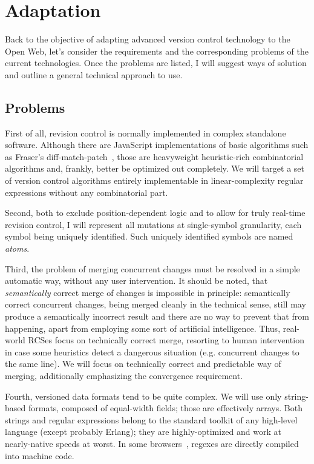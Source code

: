 \documentclass{acm_proc_article-sp}
\begin{document}
\section {Adaptation}   \label{sec:textile}

Back to the objective of adapting advanced version control technology to the Open Web, let's consider the requirements and the corresponding problems of the current technologies. 
Once the problems are listed, I will suggest ways of solution and outline a general technical approach to use.

\subsection {Problems}
First of all, revision control is normally implemented
in complex standalone software. Although there are JavaScript
implementations of basic algorithms such as Fraser's
diff-match-patch~\cite{diff-match-patch}, those are
heavyweight heuristic-rich combinatorial
algorithms and, frankly, better be optimized out
completely. We will target a set of version control
algorithms entirely implementable in 
linear-complexity regular
expressions without any combinatorial part.

Second, both to exclude position-dependent logic and to allow for truly real-time revision control, I will represent all mutations at single-symbol granularity, each symbol being uniquely identified.
Such uniquely identified symbols are named \emph{atoms}.

Third, the problem of merging concurrent changes must
be resolved in a simple automatic way, without any user
intervention. It should be noted, that
\emph{semantically} correct merge of changes is impossible
in principle: semantically correct concurrent
changes, being merged cleanly in
the technical sense, still may produce a semantically
incorrect result and there are no way to prevent that
from happening,
apart from employing some sort of artificial
intelligence. Thus, real-world RCSes focus on technically
correct merge, resorting to human intervention in case
some heuristics detect a dangerous situation (e.g.
concurrent changes to the same line).
We will focus on technically correct and predictable way
of merging, additionally emphasizing the convergence
requirement.

Fourth, versioned data formats tend to be quite complex.
We will use only string-based formats, composed of equal-width fields; those are effectively arrays.
Both strings and regular expressions belong to the standard toolkit of any high-level language (except probably Erlang); they are highly-optimized and work at nearly-native speeds at worst.
In some browsers~\cite{wrec}, regexes are directly compiled into machine code.
\end{document}
